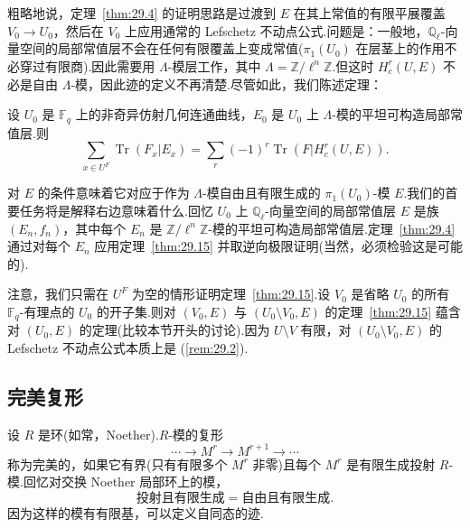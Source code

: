 粗略地说，定理~\ref{thm:29.4} 的证明思路是过渡到 $E$ 在其上常值的有限平展覆盖 $V_0 \to U_0$，然后在 $V_0$ 上应用通常的 Lefschetz 不动点公式.问题是：一般地，$\mathbb{Q}_{\ell}$-向量空间的局部常值层不会在任何有限覆盖上变成常值($\pi_1(U_0)$ 在层茎上的作用不必穿过有限商).因此需要用 $\Lambda$-模层工作，其中 $\Lambda = \mathbb{Z}/\ell^{n}\mathbb{Z}$.但这时 $H^{r}_{c}(U, E)$ 不必是自由 $\Lambda$-模，因此迹的定义不再清楚.尽管如此，我们陈述定理：

\begin{theorem}\label{thm:29.15}
设 $U_0$ 是 $\mathbb{F}_q$ 上的非奇异仿射几何连通曲线，$E_0$ 是 $U_0$ 上 $\Lambda$-模的平坦可构造局部常值层.则
\[
\sum_{x \in U^{F}} \operatorname{Tr}(F_x|E_x) = \sum_{r} (-1)^{r} \operatorname{Tr}(F|H^{r}_{c}(U, E)).
\]
\end{theorem}

对 $E$ 的条件意味着它对应于作为 $\Lambda$-模自由且有限生成的 $\pi_1(U_0)$-模 $E$.我们的首要任务将是解释右边意味着什么.回忆 $U_0$ 上 $\mathbb{Q}_{\ell}$-向量空间的局部常值层 $E$ 是族 $(E_n, f_n)$，其中每个 $E_n$ 是 $\mathbb{Z}/\ell^{n}\mathbb{Z}$-模的平坦可构造局部常值层.定理~\ref{thm:29.4} 通过对每个 $E_n$ 应用定理~\ref{thm:29.15} 并取逆向极限证明(当然，必须检验这是可能的).

\begin{remark}\label{rem:29.16}
注意，我们只需在 $U^{F}$ 为空的情形证明定理~\ref{thm:29.15}.设 $V_0$ 是省略 $U_0$ 的所有 $\mathbb{F}_q$-有理点的 $U_0$ 的开子集.则对 $(V_0, E)$ 与 $(U_0 \setminus V_0, E)$ 的定理~\ref{thm:29.15} 蕴含对 $(U_0, E)$ 的定理(比较本节开头的讨论).因为 $U \setminus V$ 有限，对 $(U_0 \setminus V_0, E)$ 的 Lefschetz 不动点公式本质上是 (\ref{rem:29.2}).
\end{remark}

\subsection*{完美复形}

设 $R$ 是环(如常，Noether).$R$-模的复形
\[
\cdots \to M^{r} \to M^{r+1} \to \cdots
\]
称为完美的，如果它有界(只有有限多个 $M^{r}$ 非零)且每个 $M^{r}$ 是有限生成投射 $R$-模.回忆对交换 Noether 局部环上的模，
\[
\text{投射且有限生成} = \text{自由且有限生成}.
\]
因为这样的模有有限基，可以定义自同态的迹.

